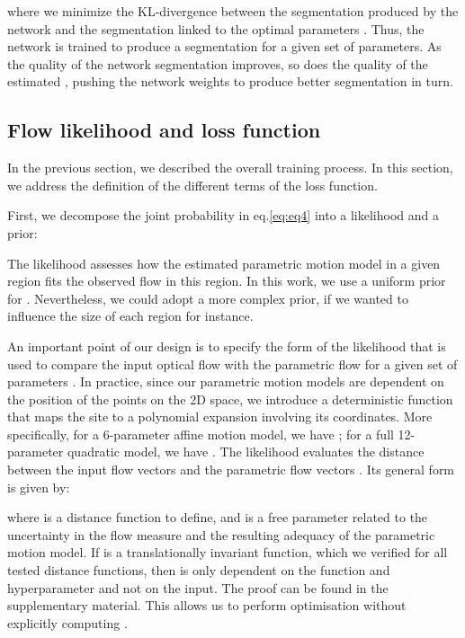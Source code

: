 \documentclass[10pt,twocolumn,letterpaper]{article}
\begin{document}
where we minimize the KL-divergence between the segmentation produced by the network and the segmentation linked to the optimal parameters . Thus, the network is trained to produce a segmentation for a given set of parameters. As the quality of the network segmentation improves, so does the quality of the estimated , pushing the network weights to produce better segmentation in turn.




\subsection{Flow likelihood and loss function}
\label{sec:dataterm}

In the previous section, we described the overall training process. In this section, we address the definition of the different terms of the loss function. 

First, we decompose the joint probability in eq.\eqref{eq:eq4} into a likelihood and a prior:

The likelihood  assesses how the estimated parametric motion model in a given region fits the observed flow in this region. In this work, we use a uniform prior for . Nevertheless, we could adopt a more complex prior, if we wanted to influence the size of each region for instance.

An important point of our design is to specify the form of the likelihood  that is used to compare the input optical flow with the parametric flow for a given set of parameters . In practice, since our parametric motion models are dependent on the position of the points on the 2D space, we introduce a deterministic function  that maps the site  to a polynomial expansion involving its coordinates. More specifically, for a 6-parameter affine motion model, we have ; for a full 12-parameter quadratic model, we have . The likelihood evaluates the distance between the input flow vectors  and the parametric flow vectors . Its general form is given by:

where  is a distance function to define, {\color{black} and  is a free parameter related to the uncertainty in the flow measure and the resulting adequacy of the parametric motion model.} If  is a translationally invariant function, which we verified for all tested distance functions, then  is only dependent on the function  {\color{black} and hyperparameter } and not on the input. The proof can be found in the supplementary material. This allows us to perform optimisation without explicitly computing .
\end{document}

